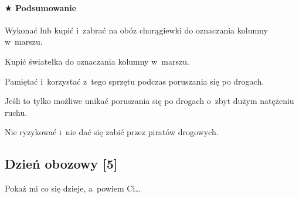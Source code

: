 \documentclass[a5paper,10pt,titlepage,twoside]{article}
\newcommand*{\thecheckbox}{\hss$\Box$} %
\newenvironment*{checklist}
{\list{}{%
\renewcommand*{\makelabel}[1]{\thecheckbox}}}
{\endlist}
\begin{document}
\paragraph{$\bigstar$ Podsumowanie}
\begin{checklist}
\item Wykonać lub kupić i~zabrać na obóz chorągiewki do oznaczania kolumny w~marszu.
\item Kupić światełka do oznaczania kolumny w~marszu.
\item Pamiętać i~korzystać z~tego sprzętu podczas poruszania się po drogach.
\item Jeśli to tylko możliwe unikać poruszania się po drogach o~zbyt dużym natężeniu ruchu.
\item Nie ryzykować i~nie dać się zabić przez piratów drogowych.
\end{checklist}
\subsection{Dzień obozowy [5]}
Pokaż mi co się dzieje, a~powiem Ci\ldots
\end{document}
